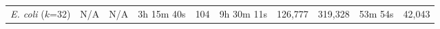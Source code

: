\begin{table}
\begin{tabularx}{\textwidth}{@{}Yrrrrrrrrr@{}}


    
    \emph{E. coli} ($k$=32)         & N/A & N/A & 3h 15m 40s & 104 & 9h 30m 11s & 126,777 & 319,328 &  53m 54s & 42,043 \\




\end{tabularx}
\end{table}
